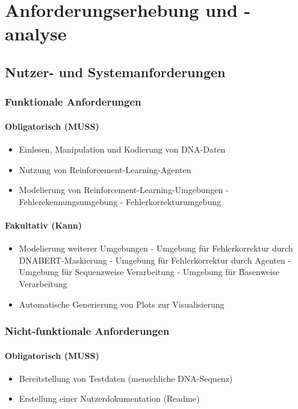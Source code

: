 \documentclass[oneside,bibliography=totocnumbered,BCOR=5mm]{scrbook}%
\theoremstyle{definition}
\theoremstyle{definition}
\theoremstyle{definition}
\theoremstyle{definition}
\theoremstyle{definition}
\theoremstyle{definition}
\begin{document}
\clearpage

\chapter{Anforderungserhebung und -analyse}
\section{Nutzer- und Systemanforderungen}
\subsection{Funktionale Anforderungen}
\subsubsection{Obligatorisch (MUSS)}
\begin{itemize}
  \item Einlesen, Manipulation und Kodierung von DNA-Daten
  \item Nutzung von Reinforcement-Learning-Agenten
  \item Modelierung von Reinforcement-Learning-Umgebungen
    \subitem - Fehlerekennungsumgebung
    \subitem - Fehlerkorrekturumgebung
  \end{itemize}
\subsubsection{Fakultativ (Kann)}
\begin{itemize}
  \item Modelierung weiterer Umgebungen
    \subitem - Umgebung für Fehlerkorrektur durch DNABERT-Maskierung
    \subitem - Umgebung für Fehlerkorrektur durch Agenten
    \subitem - Umgebung für Sequenzweise Verarbeitung
    \subitem - Umgebung für Basenweise Verarbeitung
  \item Automatische Generierung von Plots zur Visualisierung
  \end{itemize}
\subsection{Nicht-funktionale Anforderungen}
\subsubsection{Obligatorisch (MUSS)}
\begin{itemize}
  \item Bereitstellung von Testdaten (menschliche DNA-Sequenz)
  \item Erstellung einer Nutzerdokumentation (Readme)
  \end{itemize}
\end{document}
